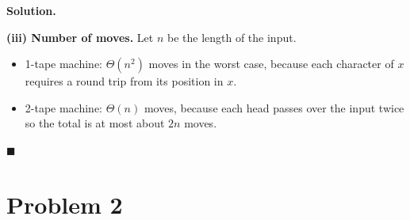 \documentclass[11pt]{article}
\newenvironment{solution}{%
  \par\noindent\textbf{Solution.}\ \normalfont
}{\hfill$\blacksquare$\par\medskip}
\theoremstyle{plain}
\theoremstyle{definition}
\begin{document}
\begin{solution}
\bigskip
\textbf{(iii) Number of moves.}
Let $n$ be the length of the input.
\begin{itemize}
  \item 1-tape machine: $\Theta(n^2)$ moves in the worst case, because each character of $x$ requires a round trip from its position in $x$.
  \item 2-tape machine: $\Theta(n)$ moves, because each head passes over the input twice so the total is at most about $2n$ moves.
\end{itemize}
\end{solution}

\newpage
\section*{Problem 2}
\end{document}
